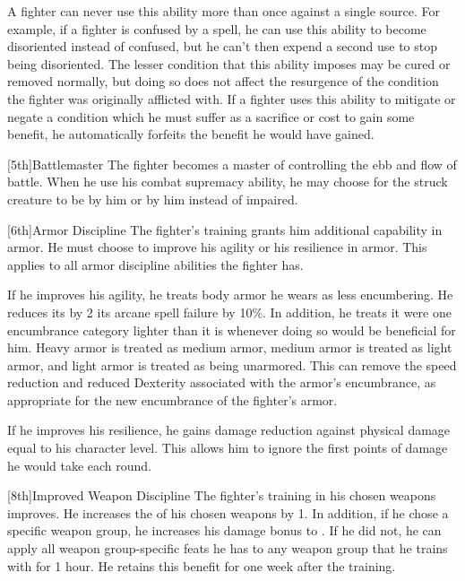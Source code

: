         \par A fighter can never use this ability more than once against a single source.
        For example, if a fighter is confused by a  spell, he can use this ability to become disoriented instead of confused, but he can't then expend a second use to stop being disoriented.
        The lesser condition that this ability imposes may be cured or removed normally, but doing so does not affect the resurgence of the condition the fighter was originally afflicted with.
        If a fighter uses this ability to mitigate or negate a condition which he must suffer as a sacrifice or cost to gain some benefit, he automatically forfeits the benefit he would have gained.

        [5th]{Battlemaster}
        The fighter becomes a master of controlling the ebb and flow of battle.
        When he use his combat supremacy ability, he may choose for the struck creature to be \goaded by him or \shaken by him instead of impaired.

        [6th]{Armor Discipline}
        The fighter's training grants him additional capability in armor.
        He must choose to improve his agility or his resilience in armor.
        This applies to all armor discipline abilities the fighter has.

        If he improves his agility, he treats body armor he wears as less encumbering.
        He reduces its  by 2 its arcane spell failure by 10\%.
        In addition, he treats it were one encumbrance category lighter than it is whenever doing so would be beneficial for him.
        Heavy armor is treated as medium armor, medium armor is treated as light armor, and light armor is treated as being unarmored.
        This can remove the speed reduction and reduced Dexterity associated with the armor's encumbrance, as appropriate for the new encumbrance of the fighter's armor.

        If he improves his resilience, he gains damage reduction against physical damage equal to his character level. This allows him to ignore the first points of damage he would take each round.

        [8th]{Improved Weapon Discipline}
        The fighter's training in his chosen weapons improves.
        He increases the  of his chosen weapons by 1.
        In addition, if he chose a specific weapon group, he increases his damage bonus to .
        If he did not, he can apply all weapon group-specific feats he has to any weapon group that he trains with for 1 hour.
        He retains this benefit for one week after the training.

